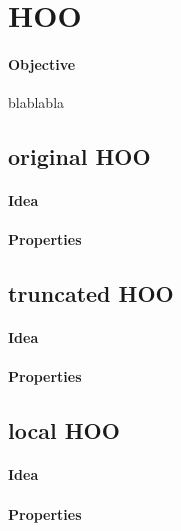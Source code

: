 \documentclass[a4paper,11pt,titlepage]{article}
\begin{document}
\section{HOO}
\paragraph{Objective}
blablabla
\subsection{original HOO}
\paragraph{Idea}
\paragraph{Properties}
\subsection{truncated HOO}
\paragraph{Idea}
\paragraph{Properties}
\subsection{local HOO}
\paragraph{Idea}
\paragraph{Properties}
\end{document}
